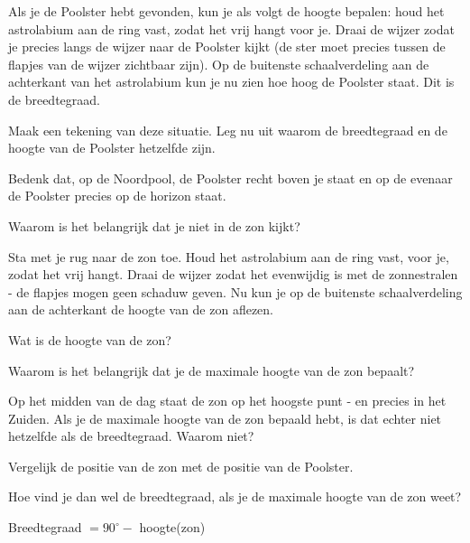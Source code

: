 Als je de Poolster hebt gevonden, kun je als volgt de hoogte bepalen: houd het astrolabium aan de ring vast, zodat het vrij hangt voor je. Draai de wijzer zodat je precies langs de wijzer naar de Poolster kijkt (de ster moet precies tussen de flapjes van de wijzer zichtbaar zijn). Op de buitenste schaalverdeling aan de achterkant van het astrolabium kun je nu zien hoe hoog de Poolster staat. Dit is de breedtegraad.

\begin{opgave}
Maak een tekening van deze situatie. Leg nu uit waarom de breedtegraad en de hoogte van de Poolster hetzelfde zijn.
\begin{hint}
 Bedenk dat, op de Noordpool, de Poolster recht boven je staat en op de evenaar de Poolster precies op de horizon staat.
\end{hint}
\end{opgave}

\begin{opgave}[\schaar]
 \label{astrolabium:breedtegraad}
 \begin{subopgave}
  Waarom is het belangrijk dat je niet in de zon kijkt?
 \end{subopgave}
 Sta met je rug naar de zon toe. Houd het astrolabium aan de ring vast, voor je, zodat het vrij hangt. Draai de wijzer zodat het evenwijdig is met de zonnestralen - de flapjes mogen geen schaduw geven. Nu kun je op de buitenste schaalverdeling aan de achterkant de hoogte van de zon aflezen. 
 \begin{subopgave}
  Wat is de hoogte van de zon?
 \end{subopgave}
\end{opgave}

\begin{opgave}
 Waarom is het belangrijk dat je de maximale hoogte van de zon bepaalt?
\end{opgave}

\begin{opgave}
 Op het midden van de dag staat de zon op het hoogste punt - en precies in het Zuiden. Als je de maximale hoogte van de zon bepaald hebt, is dat echter niet hetzelfde als de breedtegraad. Waarom niet?
 \begin{hint}
  Vergelijk de positie van de zon met de positie van de Poolster.
 \end{hint}
\end{opgave}

\begin{opgave}
 Hoe vind je dan wel de breedtegraad, als je de maximale hoogte van de zon weet?
 \begin{antwoord}
  Breedtegraad $= 90^{\circ} -$ hoogte(zon)
 \end{antwoord}
\end{opgave}

